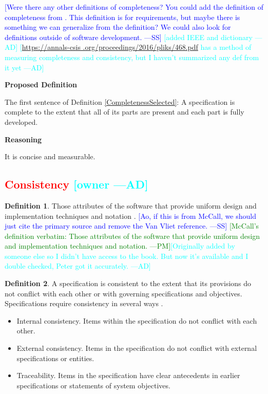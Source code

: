 \documentclass[letterpaper, cleveref]{lipics-v2019}
\newcommand{\authornote}[3]{\textcolor{#1}{[#3 ---#2]}}
\newcommand{\authornote}[3]{}
\newcommand{\wss}[1]{\authornote{blue}{SS}{#1}} %
\newcommand{\pmi}[1]{\authornote{green}{PM}{#1}} %
\newcommand{\ad}[1]{\authornote{cyan}{AD}{#1}} %
\newcommand{\notdone}[1]{\textcolor{red}{#1}}
\theoremstyle{definition}
\newtheorem{defn}{Definition}
\begin{document}
\wss{Were there any other definitions of completeness?  You could add the
definition of completeness from \citet[p.\ 5--6]{IEEE1998}.  This definition
is for requirements, but maybe there is something we can generalize from the
definition?  We could also look for definitions outside of software
development.} \ad{added IEEE and dictionary} \ad{\url{https://annals-csis
.org/proceedings/2016/pliks/468.pdf} has a method of measuring completeness
and consistency, but I haven't summarized any def from it yet}

\noindent \textbf{Proposed Definition} 

The first sentence of Definition \ref{CompletenessSelected}: A specification is
complete to the extent that all of its parts are present and each part is fully
developed.

\noindent \textbf{Reasoning}

It is concise and measurable.


\subsection{\notdone{Consistency} \ad{owner}}

\begin{defn}
  Those attributes of the software that provide uniform design and
  implementation techniques and notation \citep{McCallEtAl1977}.  \wss{Ao,
    if this is from McCall, we should just cite the primary source and
    remove the Van Vliet reference.} \pmi{McCall's definition verbatim:
  Those attributes of the software that provide uniform design and
  implementation techniques and notation.}\ad{Originally added by someone
  else so I didn't have access to the book. But now it's available and I
  double checked, Peter got it accurately.}
\end{defn}

\begin{defn}
  \label{ConsistencySelected} A specification is consistent to the extent
  that its provisions do not conflict with each other or with governing
  specifications and objectives. Specifications require consistency in
  several ways \citep{Boehm1984}.
  \begin{itemize}
  \item Internal consistency. Items within the specification do not conflict
    with each other.
  \item External consistency. Items in the specification do not conflict with
    external specifications or entities.
  \item Traceability. Items in the specification have clear antecedents in
    earlier specifications or statements of system objectives.
  \end{itemize}
\end{defn}
\end{document}

